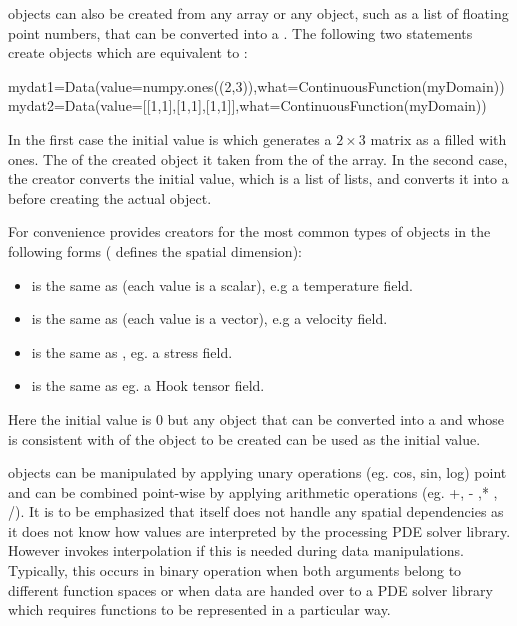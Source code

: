 \Data objects can also be created from any \numpy
array or any object, such as a list of floating point numbers, 
that can be converted into a \numpyNDA \cite{NUMPY}. 
The following two statements
create objects which are equivalent to :
\begin{python}
  mydat1=Data(value=numpy.ones((2,3)),what=ContinuousFunction(myDomain))
  mydat2=Data(value=[[1,1],[1,1],[1,1]],what=ContinuousFunction(myDomain))
\end{python}
In the first case the initial value is 
which generates a $2 \times 3$ matrix as a \numpyNDA
filled with ones. The \Shape of the created \Data object
it taken from the \Shape of the array. In the second
case, the creator converts the initial value, which is a list of lists,
and converts it into a \numpyNDA before creating the actual
\Data object.      

For convenience \escript provides creators for the most common types
of \Data objects in the following forms ( defines the 
spatial dimension):
\begin{itemize}
\item {} is the same as  (each value is a scalar), 
e.g a temperature field. 
\item {} is the same as  (each value is a vector), e.g
a velocity field.   
\item {} is the same as ,
eg. a stress field.  
\item {} is the same as 
eg. a Hook tensor field.   
\end{itemize}
Here the initial value is $0$ but any object that can be converted into a \numpyNDA and whose \Shape
is consistent with \Shape of the \Data object to be created can be used as the initial value.

\Data objects can be manipulated by applying unary operations (eg. cos, sin, log) point
and can be combined point-wise by applying arithmetic operations (eg. +, - ,* , /). 
It is to be emphasized that \escript itself does not handle any spatial dependencies as 
it does not know how values are interpreted by the processing PDE solver library. 
However \escript invokes interpolation if this is needed during data manipulations. 
Typically, this occurs in binary operation when both arguments belong to different
function spaces or when data are handed over to a PDE solver library 
which requires functions to be represented in a particular way. 

